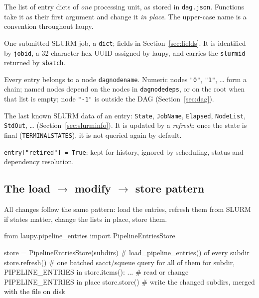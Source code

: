 \documentclass[11pt,a4paper]{article}
\DeclareRobustCommand{\_}{\textunderscore\allowbreak}
\newcommand{\cmd}[1]{\texttt{#1}}
\begin{document}
\begin{description}[style=nextline,leftmargin=1.5em]
  \item[\cmd{PIPELINE\_ENTRIES}] The list of entry dicts of \emph{one} processing unit, as stored
    in \cmd{dag.json}. Functions take it as their first argument and change it \emph{in place}.
    The upper-case name is a convention throughout laupy.
  \item[Entry] One submitted SLURM job, a \cmd{dict}; fields in Section~\ref{sec:fields}. It is
    identified by \cmd{job\_id}, a 32-character hex UUID assigned by laupy, and carries the
    \cmd{slurm\_id} returned by \cmd{sbatch}.
  \item[DAG node] Every entry belongs to a node \cmd{dag\_node\_name}. Numeric nodes
    \cmd{"0"}, \cmd{"1"}, \ldots{} form a chain; named nodes depend on the nodes in
    \cmd{dag\_node\_deps}, or on the root when that list is empty; node \cmd{"-1"} is outside the
    DAG (Section~\ref{sec:dag}).
  \item[\cmd{slurm\_info}] The last known SLURM data of an entry: \cmd{State}, \cmd{JobName},
    \cmd{Elapsed}, \cmd{NodeList}, \cmd{StdOut}, \ldots{} (Section~\ref{sec:slurminfo}). It is
    updated by a \emph{refresh}; once the state is final (\cmd{TERMINAL\_STATES}), it is not
    queried again by default.
  \item[Retired] \cmd{entry["retired"] = True}: kept for history, ignored by scheduling, status and
    dependency resolution.
\end{description}

\subsection{The load $\rightarrow$ modify $\rightarrow$ store pattern}

All changes follow the same pattern: load the entries, refresh them from SLURM if states matter,
change the lists in place, store them.

\begin{code}
from laupy.pipeline_entries import PipelineEntriesStore

store = PipelineEntriesStore(subdirs)  # load_pipeline_entries() of every subdir
store.refresh()                        # one batched sacct/squeue query for all of them
for subdir, PIPELINE_ENTRIES in store.items():
    ...                                # read or change PIPELINE_ENTRIES in place
store.store()                          # write the changed subdirs, merged with the file on disk
\end{code}
\end{document}
